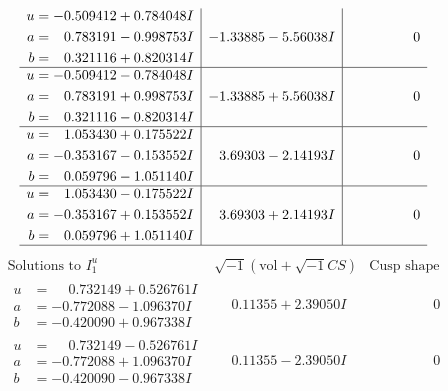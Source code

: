 \documentclass[1p]{elsarticle_modified}
\theoremstyle{definition}
\newcommand{\I}{\sqrt{-1}}
\begin{document}
$$\begin{array}{c|c|c}
\begin{aligned}
u &= -0.509412 + 0.784048 I \\
a &= \phantom{-}0.783191 - 0.998753 I \\
b &= \phantom{-}0.321116 + 0.820314 I\end{aligned}
 & -1.33885 - 5.56038 I & \phantom{-0.000000 } 0 \\ \hline\begin{aligned}
u &= -0.509412 - 0.784048 I \\
a &= \phantom{-}0.783191 + 0.998753 I \\
b &= \phantom{-}0.321116 - 0.820314 I\end{aligned}
 & -1.33885 + 5.56038 I & \phantom{-0.000000 } 0 \\ \hline\begin{aligned}
u &= \phantom{-}1.053430 + 0.175522 I \\
a &= -0.353167 - 0.153552 I \\
b &= \phantom{-}0.059796 - 1.051140 I\end{aligned}
 & \phantom{-}3.69303 - 2.14193 I & \phantom{-0.000000 } 0 \\ \hline\begin{aligned}
u &= \phantom{-}1.053430 - 0.175522 I \\
a &= -0.353167 + 0.153552 I \\
b &= \phantom{-}0.059796 + 1.051140 I\end{aligned}
 & \phantom{-}3.69303 + 2.14193 I & \phantom{-0.000000 } 0\\
 \hline 
 \end{array}$$\newpage$$\begin{array}{c|c|c}  
\text{Solutions to }I^u_{1}& \I (\text{vol} + \sqrt{-1}CS) & \text{Cusp shape}\\
 \hline 
\begin{aligned}
u &= \phantom{-}0.732149 + 0.526761 I \\
a &= -0.772088 - 1.096370 I \\
b &= -0.420090 + 0.967338 I\end{aligned}
 & \phantom{-}0.11355 + 2.39050 I & \phantom{-0.000000 } 0 \\ \hline\begin{aligned}
u &= \phantom{-}0.732149 - 0.526761 I \\
a &= -0.772088 + 1.096370 I \\
b &= -0.420090 - 0.967338 I\end{aligned}
 & \phantom{-}0.11355 - 2.39050 I & \phantom{-0.000000 } 0 \\ \hline\begin{aligned}

\end{aligned}
\end{array}$$
\end{document}
